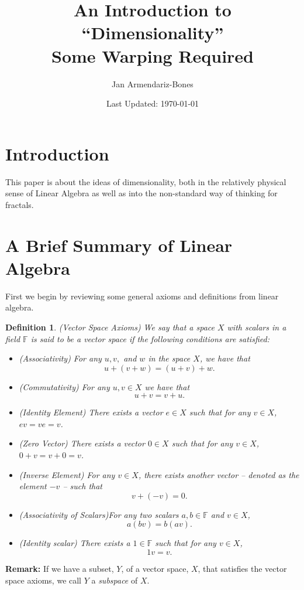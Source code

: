 \documentclass{article}
\title{An Introduction to ``Dimensionality''\\Some Warping Required}
\author{Jan Armendariz-Bones}
\date{Last Updated: \today}
\newtheorem{definition}{Definition}
\begin{document}
\maketitle
\tableofcontents
\setcounter{section}{-1}
\section{Introduction}
This paper is about the ideas of dimensionality, both in the relatively physical sense of Linear Algebra as well as into the non-standard way of thinking for fractals.
\section{A Brief Summary of Linear Algebra}
First we begin by reviewing some general axioms and definitions from linear algebra.

\begin{definition} (Vector Space Axioms)
		We say that a space $X$ with scalars in a field $\mathbb{F}$ is said to be a vector space if the following conditions are satisfied:
		\begin{itemize}
				\item (Associativity) For any $u,v,$ and $w$ in the space $X$, we have that \[u+(v+w)=(u+v)+w.\]
				\item (Commutativity) For any $u,v\in X$ we have that \[u+v=v+u.\]
				\item (Identity Element) There exists a vector $e\in X$ such that for any $v\in X$, $ev=ve=v$.
				\item (Zero Vector) There exists a vector $0\in X$ such that for any $v\in X$, $0+v=v+0=v$.   
				\item (Inverse Element) For any $v\in X$, there exists another vector -- denoted as the element $-v$ -- such that
						\[
								v+(-v)=0.
						\]
				\item (Associativity of Scalars)For any two scalars $a,b\in\mathbb{F}$ and $v\in X$,
						\[
								a(bv) = b(av).
						\]
		\item (Identity scalar) There exists a $1\in\mathbb{F}$ such that for any $v\in X$, \[1v=v.\] 
		\end{itemize}	
\end{definition}	
\noindent\textbf{Remark:} If we have a subset, $Y$,  of a vector space, $X$,  that satisfies the vector space axioms, we call $Y$ a \emph{subspace} of $X$. 
\end{document}
